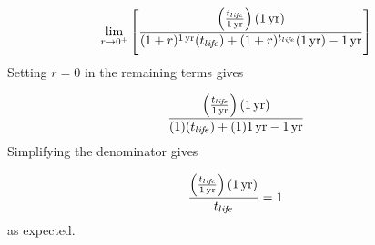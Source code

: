 \begin{equation}
  \lim_{r \to 0^+} 
  \left[
    \frac{\left(\frac{t_{li\!f\!e}}{1\,\mathrm{yr}}\right) (1\,\mathrm{yr})}
         {(1 + r)^{1\,\mathrm{yr}} (t_{li\!f\!e}) + 
          (1 + r)^{t_{li\!f\!e}} (1\,\mathrm{yr}) - 
          1\,\mathrm{yr}}
  \right]
\end{equation}
%
Setting $r = 0$ in the remaining terms gives

\begin{equation}
  \frac{\left( \frac{t_{li\!f\!e}}{1\,\mathrm{yr}} \right) (1\,\mathrm{yr})}
  {(1) (t_{li\!f\!e}) + (1) 1\,\mathrm{yr} - 1\,\mathrm{yr}}
\end{equation}
%
Simplifying the denominator gives

\begin{equation}
  \frac{\left( \frac{t_{li\!f\!e}}{1\,\mathrm{yr}} \right) (1\,\mathrm{yr})}
       {t_{li\!f\!e}} = 1 \, 
\end{equation}
%
as expected.

